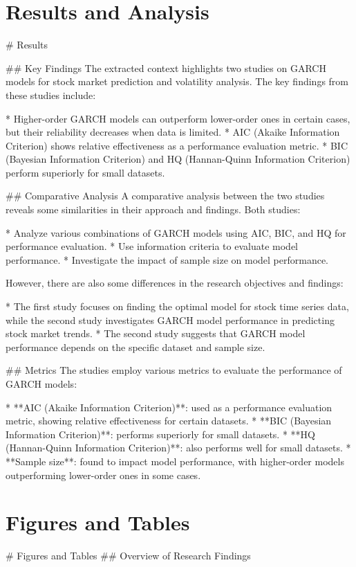 \documentclass[conference]{IEEEtran}
\begin{document}
\section{Results and Analysis}
\# Results

\#\# Key Findings
The extracted context highlights two studies on GARCH models for stock market prediction and volatility analysis. The key findings from these studies include:

* Higher-order GARCH models can outperform lower-order ones in certain cases, but their reliability decreases when data is limited.
* AIC (Akaike Information Criterion) shows relative effectiveness as a performance evaluation metric.
* BIC (Bayesian Information Criterion) and HQ (Hannan-Quinn Information Criterion) perform superiorly for small datasets.

\#\# Comparative Analysis
A comparative analysis between the two studies reveals some similarities in their approach and findings. Both studies:

* Analyze various combinations of GARCH models using AIC, BIC, and HQ for performance evaluation.
* Use information criteria to evaluate model performance.
* Investigate the impact of sample size on model performance.

However, there are also some differences in the research objectives and findings:

* The first study focuses on finding the optimal model for stock time series data, while the second study investigates GARCH model performance in predicting stock market trends.
* The second study suggests that GARCH model performance depends on the specific dataset and sample size.

\#\# Metrics
The studies employ various metrics to evaluate the performance of GARCH models:

* **AIC (Akaike Information Criterion)**: used as a performance evaluation metric, showing relative effectiveness for certain datasets.
* **BIC (Bayesian Information Criterion)**: performs superiorly for small datasets.
* **HQ (Hannan-Quinn Information Criterion)**: also performs well for small datasets.
* **Sample size**: found to impact model performance, with higher-order models outperforming lower-order ones in some cases.

\section{Figures and Tables}
\# Figures and Tables
\#\# Overview of Research Findings
\end{document}
